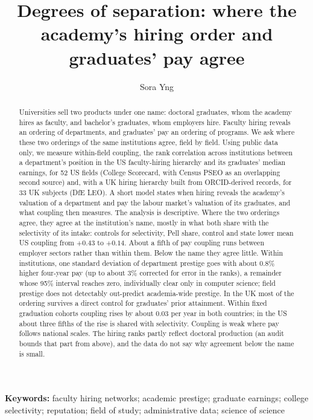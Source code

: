 \documentclass[11pt]{article}
\title{Degrees of separation: where the academy's hiring order and graduates' pay agree}
\author{Sora Yng}
\date{}
\begin{document}
\maketitle

\begin{abstract}
Universities sell two products under one name: doctoral graduates, whom the academy hires as faculty, and
bachelor's graduates, whom employers hire. Faculty hiring reveals an ordering of departments, and graduates' pay an
ordering of programs. We ask where these two orderings of the same institutions agree, field by field. Using public
data only, we measure within-field coupling, the rank correlation across institutions between a department's
position in the US faculty-hiring hierarchy and its graduates' median earnings, for 52 US fields (College
Scorecard, with Census PSEO as an overlapping second source) and, with a UK hiring hierarchy built from
ORCID-derived records, for 33 UK subjects (DfE LEO). A short model states when hiring reveals the academy's
valuation of a department and pay the labour market's valuation of its graduates, and what coupling then
measures. The analysis is descriptive. Where the two orderings agree, they agree at the institution's name,
mostly in what both share with the selectivity of its intake: controls for selectivity, Pell share, control and
state lower mean US coupling from $+0.43$ to $+0.14$. About a fifth of pay coupling runs between employer sectors
rather than within them. Below the name they agree little. Within institutions, one standard deviation of department prestige goes
with about 0.8\% higher four-year pay (up to about 3\% corrected for error in the ranks), a remainder whose 95\%
interval reaches zero, individually clear only in computer science; field prestige does not detectably out-predict
academia-wide prestige. In the UK most of the ordering survives a direct control for graduates' prior attainment.
Within fixed graduation cohorts coupling rises by about 0.03 per year in both countries; in the US about three
fifths of the rise is shared with selectivity. Coupling is weak where pay follows national scales. The hiring
ranks partly reflect doctoral production (an audit bounds that part from above), and the data do not say why
agreement below the name is small.
\end{abstract}

\noindent\textbf{Keywords:} faculty hiring networks; academic prestige; graduate earnings; college
selectivity; reputation; field of study; administrative data; science of science
\end{document}
